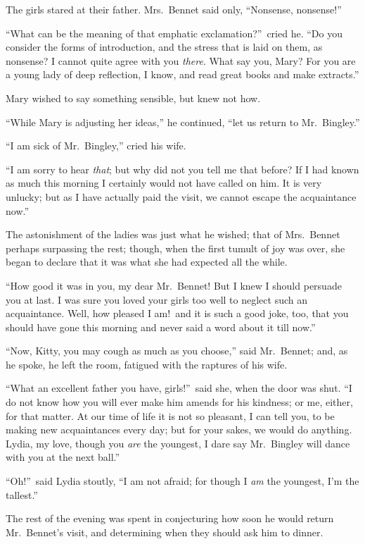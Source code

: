 \documentclass[12pt,english]{book}
\begin{document}
The girls stared at their father. Mrs.\ Bennet said only, {}``Nonsense,
nonsense!''\ 

{}``What can be the meaning of that emphatic exclamation?''\ cried
he. {}``Do you consider the forms of introduction, and the stress
that is laid on them, as nonsense? I cannot quite agree with you \textit{there}.
What say you, Mary? For you are a young lady of deep reflection, I
know, and read great books and make extracts.''

Mary wished to say something sensible, but knew not how.

{}``While Mary is adjusting her ideas,'' he continued, {}``let
us return to Mr.\ Bingley.''

{}``I am sick of Mr.\ Bingley,'' cried his wife.

{}``I am sorry to hear \textit{that}; but why did not you tell me
that before? If I had known as much this morning I certainly would
not have called on him. It is very unlucky; but as I have actually
paid the visit, we cannot escape the acquaintance now.''

The astonishment of the ladies was just what he wished; that of Mrs.\ Bennet
perhaps surpassing the rest; though, when the first tumult of joy
was over, she began to declare that it was what she had expected all
the while.

{}``How good it was in you, my dear Mr.\ Bennet! But I knew I should
persuade you at last. I was sure you loved your girls too well to
neglect such an acquaintance. Well, how pleased I am!\ and it is
such a good joke, too, that you should have gone this morning and
never said a word about it till now.''

{}``Now, Kitty, you may cough as much as you choose,'' said Mr.\ 
Bennet; and, as he spoke, he left the room, fatigued with the raptures
of his wife.

{}``What an excellent father you have, girls!''\ said she, when
the door was shut. {}``I do not know how you will ever make him amends
for his kindness; or me, either, for that matter. At our time of life
it is not so pleasant, I can tell you, to be making new acquaintances
every day; but for your sakes, we would do anything. Lydia, my love,
though you \textit{are} the youngest, I dare say Mr.\ Bingley will
dance with you at the next ball.''

{}``Oh!''\ said Lydia stoutly, {}``I am not afraid; for though
I \textit{am} the youngest, I'm the tallest.''

The rest of the evening was spent in conjecturing how soon he would
return Mr.\ Bennet's visit, and determining when they should ask
him to dinner.
\end{document}
